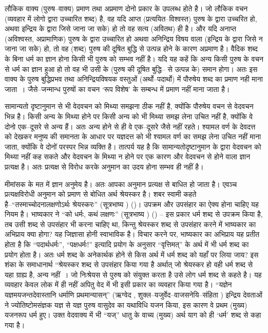 लौकिक वाक्य (पुरुष–वाक्य) प्रमाण तथा अप्रमाण दोनो प्रकार के उपलब्ध होते है। जो लौकिक वचन (व्यवहार में लोगो द्वारा उच्चारित शब्द) है, वह यदि आप्त (प्रत्ययित–विश्वस्त) पुरुष के द्वारा उच्चरित हो, अथवा इन्द्रिय के द्वारा जिसे जाना जा सके) हो तो वह सत्य (अवितथ) ही है। और यदि अनाप्त (अविश्वस्त, अप्रामाणिक) पुरुष के द्वारा उच्चारित हो अथवा अनिन्द्रिय विषय वाला (इन्द्रिय के द्वारा जिसे न जाना जा सके) हो, तो वह (शब्द) पुरुष की दूषित बुद्धि से उत्पन्न होने के कारण अप्रमाण है। वैदिक शब्द के बिना धर्म का ज्ञान होना किसी भी पुरुष को सम्भव नहीं है। यदि यह कहें कि अन्य किसी पुरुष के वचन से धर्म का ज्ञान हुआ हो तो वह भी उसी के (पुरुष की दूषित बुद्धि– से उत्पन्न के) समान होगा। अतः इस वाक्य के पुरुष बुद्धिप्रभव तथा अनिन्द्रियविषयक वस्तुओं (अर्थो–पदार्थो) में पौरुषेय शब्द का प्रमाण नही माना जाता~। जैसे–जन्मान्ध पुरुषों का वचन ‘रूप विशेष' के सम्बन्ध में प्रमाण नहीं माना जाता है।

सामान्यतो दृष्टानुमान से भी वेदवचन को मिथ्या समझना ठीक नहीं है, क्योंकि पौरुषेय वचन से वेदवचन भिन्न है। किसी अन्य के मिथ्या होने पर किसी अन्य को भी मिथ्या समझ लेना उचित नहीं है, क्योंकि वे दोनो एक–दूसरे से अन्य हैं। अतः अन्य होने से ही वे एक–दूसरे जैसे नहीं रहते। श्यामल वर्ण के देवदत्त को देखकर मनुष्य की समानता के आधार पर यज्ञदत्त को भी श्यामल वर्ण का समझ लेना उचित नहीं माना जाता, क्योंकि वे दोनो॑ परस्पर भिन्न व्यक्ति है। तात्पर्य यह है कि सामान्यतोदृष्टानुमान के द्वारा वेदवचन को मिथ्या नहीं कह सकते और वेदवचन के मिथ्या न होने पर एक कारण और वेदवचन से होने वाला ज्ञान प्रत्यक्ष है। अतः प्रत्यक्ष से विरोध करके अनुमान का उदय होना सम्भव ही नहीं है।

मीमांसक के मत में ज्ञान अनुमेय है। अतः आपका अनुमान प्रत्यक्ष से बाधित हो जाता है। एवञ्च प्रत्यक्षविरोधी अनुमान को प्रमाण से बोधित अर्थ श्रेयस्कर है। शबर स्वामी कहते है–“तस्माच्चोदनालक्षणोऽर्थः श्रेयस्करः” (सूत्रभाष्य ) ()। उपक्रम और उपसंहार का ऐक्य होना चाहिए यह नियम है। भाष्यकार ने “को धर्मः, कथं लक्षणः” (सूत्रभाष्य ) () – इस प्रकार धर्म शब्द से उपक्रम किया है, तब उसी शब्द से उपसंहार भी करना चाहिए था, किन्तु श्रेयस्कर शब्द से उपसंहार करने में भाष्यकार का अभिप्राय क्या होगा? यह जिज्ञासा होनी स्वाभाविक है। विचार करने पर, भाष्यकार का अभिप्राय यह प्रतीत होता है कि “पदार्थधर्मः”, “पक्षधर्मः!” इत्यादि प्रयोग के अनुसार “वृत्तिमत्” के अर्थ में भी धर्म शब्द का प्रयोग होता है। अतः धर्म शब्द के अनेकार्थक होने से किस अर्थ में धर्म शब्द को यहाँ पर लिया जाय? इस शंका के समाधानार्थ “श्रेयस्कर शब्द से उपसंहार किया गया है अर्थात् जो श्रेयस्कर हो वही धर्म शब्द से यहा ग्राह्य है, अन्य नहीं~। जो निःश्रेयस से पुरुष को संयुक्त करता है उसे लोग धर्म शब्द से कहते है। यह व्यवहार केवल लोक में ही नहीं अपितु वेद में भी इसी प्रकार का व्यवहार किया गया है। “यज्ञेन यज्ञमयजन्तदेवास्तानि धर्माणि प्रथमान्यासन्” (ऋग्वेद , शुक्ल–यजुर्वेद–वाजसनेयि–संहिता ) इन्द्रिय देवताओं ने ज्योतिष्टोमसंज्ञक यज्ञ से यज्ञ पुरुष वासुदेव का यथाविधि यजन किया, इस कारण वे प्रथम (मुख्य) यजनरूप धर्म हुए। उक्त वेदवाक्य में भी “यज्” धातु के वाच्य (मुख्य) अर्थ याग को ही ‘धर्म' शब्द से कहा गया है।

